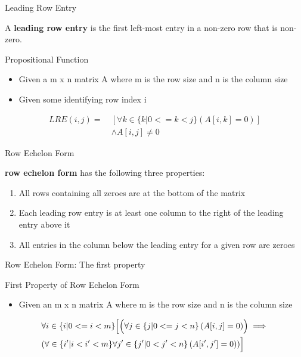 \documentclass{beamer}
\begin{document}
\begin{frame}{Leading Row Entry}
  \begin{definition}
    A \textbf{leading row entry} is the first left-most entry in a non-zero row that is non-zero.
  \end{definition}
  \begin{block}{Propositional Function}
    \begin{itemize}
      \item Given a m x n matrix A where m is the row size and n is the column size
      \item Given some identifying row index i
    \end{itemize}
    \begin{equation}
      \begin{split}
        LRE(i, j) = \ &\left[\forall k \in \{ k | 0 <= k < j \} \left( A[i, k] = 0 \right) \right] \\
                    \ &\land A[i, j] \neq 0
      \end{split}
    \end{equation}
  \end{block}
\end{frame}

\begin{frame}{Row Echelon Form}
  \begin{definition}
    \textbf{row echelon form} has the following three properties:
    \begin{enumerate}
      \item All rows containing all zeroes are at the bottom of the matrix
      \item Each leading row entry is at least one column to the right of the leading entry above it
      \item All entries in the column below the leading entry for a given row are zeroes
    \end{enumerate}
  \end{definition}
\end{frame}


\begin{frame}{Row Echelon Form: The first property}
  \begin{block}{First Property of Row Echelon Form}
    \begin{itemize}
    \item Given an m x n matrix A where m is the row size and n is the column size
    \end{itemize}
    \begin{equation}
      \begin{split}
        &\forall i \in \{i | 0 <= i < m\} \Bigl[ \Bigl(\forall j \in \{j | 0 <= j < n \}\left( A[i, j] = 0\right) \Bigr) \implies \Bigr. \\ 
        &\Bigl .\left( \forall \in \{i^{\prime} | i < i^{\prime} < m\} \forall j^{\prime} \in \{ j^{\prime} | 0 < j^{\prime} < n \} \left( A[i^{\prime}, j^{\prime}] = 0 \right) \right) \Bigr]
      \end{split}
    \end{equation}
  \end{block}
\end{frame}
\end{document}
